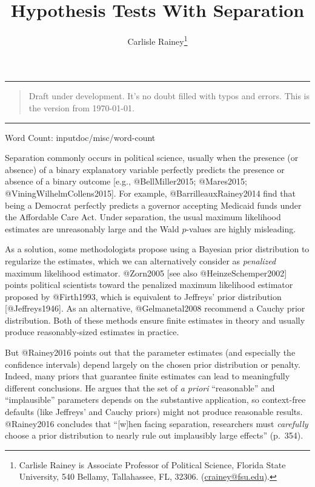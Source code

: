 \documentclass[
]{article}
\title{Hypothesis Tests With Separation}
\author{Carlisle Rainey\footnote{Carlisle Rainey is Associate Professor
  of Political Science, Florida State University, 540 Bellamy,
  Tallahassee, FL, 32306.
  (\href{mailto:crainey@fsu.edu}{crainey@fsu.edu}).}}
\date{}
\begin{document}
\maketitle

\begin{center}\rule{0.5\linewidth}{0.5pt}\end{center}

\begin{quote}
Draft under development. It's no doubt filled with typos and errors. This is the version from \today.
\end{quote}

\begin{center}\rule{0.5\linewidth}{0.5pt}\end{center}

\begin{center}
Word Count: input{doc/misc/word-count}
\end{center}

Separation commonly occurs in political science, usually when the
presence (or absence) of a binary explanatory variable perfectly
predicts the presence or absence of a binary outcome {[}e.g.,
@BellMiller2015; @Mares2015; @ViningWilhelmCollens2015{]}. For example,
@BarrilleauxRainey2014 find that being a Democrat perfectly predicts a
governor accepting Medicaid funds under the Affordable Care Act. Under
separation, the usual maximum likelihood estimates are unreasonably
large and the Wald \(p\)-values are highly misleading.

As a solution, some methodologists propose using a Bayesian prior
distribution to regularize the estimates, which we can alternatively
consider as \emph{penalized} maximum likelihood estimator. @Zorn2005
{[}see also @HeinzeSchemper2002{]} points political scientists toward
the penalized maximum likelihood estimator proposed by @Firth1993, which
is equivalent to Jeffreys' prior distribution {[}@Jeffreys1946{]}. As an
alternative, @Gelmanetal2008 recommend a Cauchy prior distribution. Both
of these methods ensure finite estimates in theory and usually produce
reasonably-sized estimates in practice.

But @Rainey2016 points out that the parameter estimates (and especially
the confidence intervals) depend largely on the chosen prior
distribution or penalty. Indeed, many priors that guarantee finite
estimates can lead to meaningfully different conclusions. He argues that
the set of \emph{a priori} ``reasonable'' and ``implausible'' parameters
depends on the substantive application, so context-free defaults (like
Jeffreys' and Cauchy priors) might not produce reasonable results.
@Rainey2016 concludes that ``{[}w{]}hen facing separation, researchers
must \emph{carefully} choose a prior distribution to nearly rule out
implausibly large effects'' (p.~354).
\end{document}
